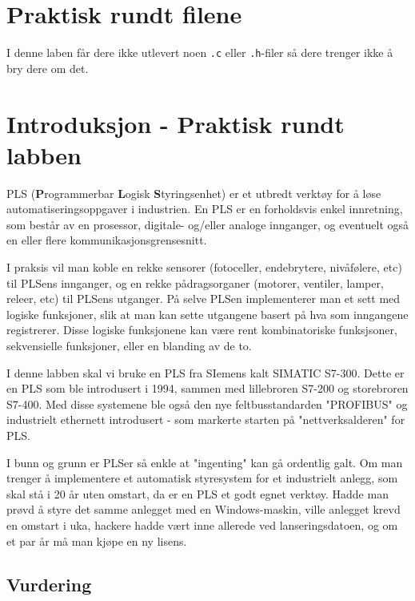 \begin{alphasection}
\section{Praktisk rundt filene}

I denne laben får dere ikke utlevert noen \verb|.c| eller \verb|.h|-filer så dere trenger ikke å bry dere om det.



\section{Introduksjon - Praktisk rundt labben}
PLS (\textbf{P}rogrammerbar \textbf{L}ogisk \textbf{S}tyringsenhet) er et utbredt verktøy for å løse automatiseringsoppgaver i industrien. En PLS er en forholdsvis enkel innretning, som består av en prosessor, digitale- og/eller analoge innganger, og eventuelt også en eller flere kommunikasjonsgrensesnitt.

I praksis vil man koble en rekke sensorer (fotoceller, endebrytere, nivåfølere, etc) til PLSens innganger, og en rekke pådragsorganer (motorer, ventiler, lamper, releer, etc) til PLSens utganger. På selve PLSen implementerer man et sett med logiske funksjoner, slik at man kan sette utgangene basert på hva som inngangene registrerer. Disse logiske funksjonene kan være rent kombinatoriske funksjsoner, sekvensielle funksjoner, eller en blanding av de to.

I denne labben skal vi bruke en PLS fra SIemens kalt SIMATIC S7-300. Dette er en PLS som ble introdusert i 1994, sammen med lillebroren S7-200 og storebroren S7-400. Med disse systemene ble også den nye feltbusstandarden "PROFIBUS" og industrielt ethernett introdusert - som markerte starten på "nettverksalderen" for PLS. 


I bunn og grunn er PLSer så enkle at "ingenting" kan gå ordentlig galt. Om man trenger å implementere et automatisk styresystem for et industrielt anlegg, som skal stå i 20 år uten omstart, da er en PLS et godt egnet verktøy. Hadde man prøvd å styre det samme anlegget med en Windows-maskin, ville anlegget krevd en omstart i uka, hackere hadde vært inne allerede ved lanseringsdatoen, og om et par år må man kjøpe en ny lisens.

\subsection*{Vurdering}




\end{alphasection}
